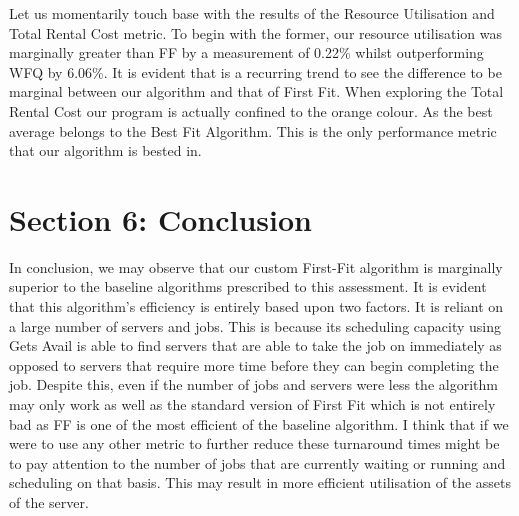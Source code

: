 \documentclass[a4paper]{article} %
\begin{document}
Let us momentarily touch base with the results of the Resource Utilisation and Total Rental Cost metric. To begin with the former, our resource utilisation was marginally greater than FF by a measurement of 0.22\% whilst outperforming WFQ by 6.06\%. It is evident that is a recurring trend to see the difference to be marginal between our algorithm and that of First Fit. When exploring the Total Rental Cost our program is actually confined to the orange colour. As the best average belongs to the Best Fit Algorithm. This is the only performance metric that our algorithm is bested in. 


\section{Section 6: Conclusion}
In conclusion, we may observe that our custom First-Fit algorithm is marginally superior to the baseline algorithms prescribed to this assessment. It is evident that this algorithm's efficiency is entirely based upon two factors. It is reliant on a large number of servers and jobs. This is because its scheduling capacity using Gets Avail is able to find servers that are able to take the job on immediately as opposed to servers that require more time before they can begin completing the job. Despite this, even if the number of jobs and servers were less the algorithm may only work as well as the standard version of First Fit which is not entirely bad as FF is one of the most efficient of the baseline algorithm. I think that if we were to use any other metric to further reduce these turnaround times might be to pay attention to the number of jobs that are currently waiting or running and scheduling on that basis. This may result in more efficient utilisation of the assets of the server.





\end{document}
